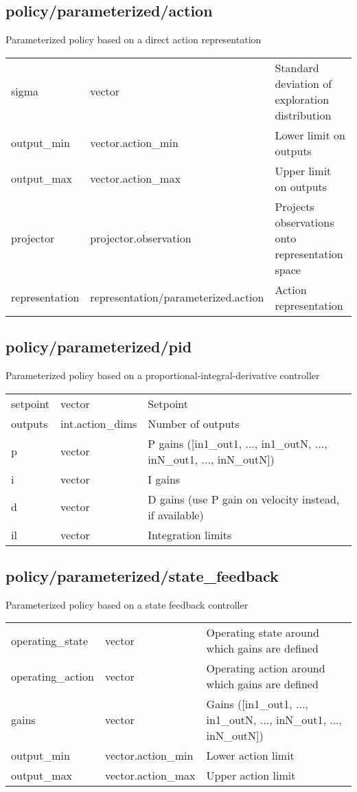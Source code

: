 \subsection{policy/parameterized/action}
\noindent Parameterized policy based on a direct action representation\\

\noindent\begin{tabular}{@{}lll@{}}
sigma&vector&Standard deviation of exploration distribution\\
output\_min&vector.action\_min&Lower limit on outputs\\
output\_max&vector.action\_max&Upper limit on outputs\\
projector&projector.observation&Projects observations onto representation space\\
representation&representation/parameterized.action&Action representation\\
\end{tabular}
\subsection{policy/parameterized/pid}
\noindent Parameterized policy based on a proportional-integral-derivative controller\\

\noindent\begin{tabular}{@{}lll@{}}
setpoint&vector&Setpoint\\
outputs&int.action\_dims&Number of outputs\\
p&vector&P gains ([in1\_out1, ..., in1\_outN, ..., inN\_out1, ..., inN\_outN])\\
i&vector&I gains\\
d&vector&D gains (use P gain on velocity instead, if available)\\
il&vector&Integration limits\\
\end{tabular}
\subsection{policy/parameterized/state\_feedback}
\noindent Parameterized policy based on a state feedback controller\\

\noindent\begin{tabular}{@{}lll@{}}
operating\_state&vector&Operating state around which gains are defined\\
operating\_action&vector&Operating action around which gains are defined\\
gains&vector&Gains ([in1\_out1, ..., in1\_outN, ..., inN\_out1, ..., inN\_outN])\\
output\_min&vector.action\_min&Lower action limit\\
output\_max&vector.action\_max&Upper action limit\\
\end{tabular}
